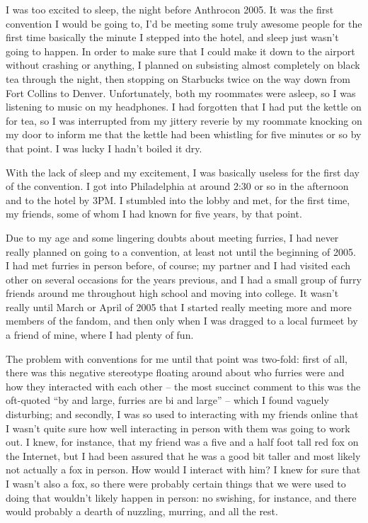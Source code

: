 
I was too excited to sleep, the night before Anthrocon 2005.  It was the first convention I would be going to, I'd be meeting some truly awesome people for the first time basically the minute I stepped into the hotel, and sleep just wasn't going to happen.  In order to make sure that I could make it down to the airport without crashing or anything, I planned on subsisting almost completely on black tea through the night, then stopping on Starbucks twice on the way down from Fort Collins to Denver.  Unfortunately, both my roommates were asleep, so I was listening to music on my headphones.  I had forgotten that I had put the kettle on for tea, so I was interrupted from my jittery reverie by my roommate knocking on my door to inform me that the kettle had been whistling for five minutes or so by that point.  I was lucky I hadn't boiled it dry.

With the lack of sleep and my excitement, I was basically useless for the first day of the convention.  I got into Philadelphia at around 2:30 or so in the afternoon and to the hotel by 3PM.  I stumbled into the lobby and met, for the first time, my friends, some of whom I had known for five years, by that point.

Due to my age and some lingering doubts about meeting furries, I had never really planned on going to a convention, at least not until the beginning of 2005.  I had met furries in person before, of course; my partner and I had visited each other on several occasions for the years previous, and I had a small group of furry friends around me throughout high school and moving into college.  It wasn't really until March or April of 2005 that I started really meeting more and more members of the fandom, and then only when I was dragged to a local furmeet by a friend of mine, where I had plenty of fun.

The problem with conventions for me until that point was two-fold: first of all, there was this negative stereotype floating around about who furries were and how they interacted with each other -- the most succinct comment to this was the oft-quoted ``by and large, furries are bi and large'' -- which I found vaguely disturbing; and secondly, I was so used to interacting with my friends online that I wasn't quite sure how well interacting in person with them was going to work out.  I knew, for instance, that my friend was a five and a half foot tall red fox on the Internet, but I had been assured that he was a good bit taller and most likely not actually a fox in person.  How would I interact with him?  I knew for sure that I wasn't also a fox, so there were probably certain things that we were used to doing that wouldn't likely happen in person: no swishing, for instance, and there would probably a dearth of nuzzling, murring, and all the rest.

